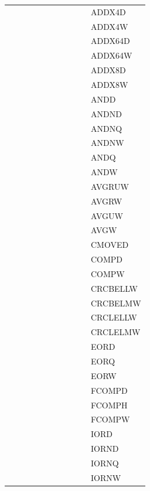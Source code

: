 {\begin{tabular}{|l|l|l|l|l|l|l|l|l|l|l|}
 & & & & & & & & & & \textsf{ADDX4D} \\
 & & & & & & & & & & \textsf{ADDX4W} \\
 & & & & & & & & & & \textsf{ADDX64D} \\
 & & & & & & & & & & \textsf{ADDX64W} \\
 & & & & & & & & & & \textsf{ADDX8D} \\
 & & & & & & & & & & \textsf{ADDX8W} \\
 & & & & & & & & & & \textsf{ANDD} \\
 & & & & & & & & & & \textsf{ANDND} \\
 & & & & & & & & & & \textsf{ANDNQ} \\
 & & & & & & & & & & \textsf{ANDNW} \\
 & & & & & & & & & & \textsf{ANDQ} \\
 & & & & & & & & & & \textsf{ANDW} \\
 & & & & & & & & & & \textsf{AVGRUW} \\
 & & & & & & & & & & \textsf{AVGRW} \\
 & & & & & & & & & & \textsf{AVGUW} \\
 & & & & & & & & & & \textsf{AVGW} \\
 & & & & & & & & & & \textsf{CMOVED} \\
 & & & & & & & & & & \textsf{COMPD} \\
 & & & & & & & & & & \textsf{COMPW} \\
 & & & & & & & & & & \textsf{CRCBELLW} \\
 & & & & & & & & & & \textsf{CRCBELMW} \\
 & & & & & & & & & & \textsf{CRCLELLW} \\
 & & & & & & & & & & \textsf{CRCLELMW} \\
 & & & & & & & & & & \textsf{EORD} \\
 & & & & & & & & & & \textsf{EORQ} \\
 & & & & & & & & & & \textsf{EORW} \\
 & & & & & & & & & & \textsf{FCOMPD} \\
 & & & & & & & & & & \textsf{FCOMPH} \\
 & & & & & & & & & & \textsf{FCOMPW} \\
 & & & & & & & & & & \textsf{IORD} \\
 & & & & & & & & & & \textsf{IORND} \\
 & & & & & & & & & & \textsf{IORNQ} \\
 & & & & & & & & & & \textsf{IORNW} \\

\end{tabular}}
